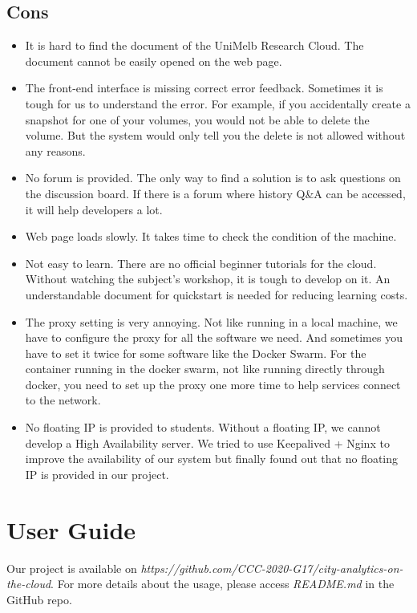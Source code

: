 \documentclass{article}
\begin{document}
\subsection{Cons}
\begin{itemize}
	\item It is hard to find the document of the UniMelb Research Cloud. The document cannot be easily opened on the web page.  
	\item The front-end interface is missing correct error feedback. Sometimes it is tough for us to understand the error. For example, if you accidentally create a snapshot for one of your volumes, you would not be able to delete the volume. But the system would only tell you the delete is not allowed without any reasons.
	\item No forum is provided. The only way to find a solution is to ask questions on the discussion board. If there is a forum where history Q\&A can be accessed, it will help developers a lot.
	\item Web page loads slowly. It takes time to check the condition of the machine.
	\item Not easy to learn. There are no official beginner tutorials for the cloud. Without watching the subject's workshop, it is tough to develop on it. An understandable document for quickstart is needed for reducing learning costs.
	\item The proxy setting is very annoying. Not like running in a local machine, we have to configure the proxy for all the software we need. And sometimes you have to set it twice for some software like the Docker Swarm. For the container running in the docker swarm, not like running directly through docker, you need to set up the proxy one more time to help services connect to the network.
	\item No floating IP is provided to students. Without a floating IP, we cannot develop a High Availability server. We tried to use Keepalived + Nginx to improve the availability of our system but finally found out that no floating IP is provided in our project.
\end{itemize}

\clearpage
\section{User Guide}
Our project is available on \textit{https://github.com/CCC-2020-G17/city-analytics-on-the-cloud}. For more details about the usage, please access \textit{README.md} in the GitHub repo.
\end{document}
